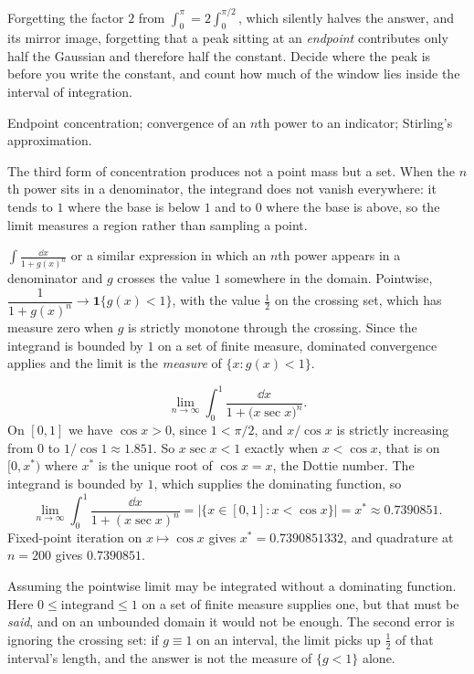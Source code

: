 \begin{trap}
Forgetting the factor $2$ from $\int_{0}^{\pi}=2\int_{0}^{\pi/2}$, which silently halves the answer, and its mirror image, forgetting that a peak sitting at an \emph{endpoint} contributes only half the Gaussian and therefore half the constant. Decide where the peak is before you write the constant, and count how much of the window lies inside the interval of integration.
\end{trap}

\begin{seealsob}Endpoint concentration; convergence of an $n$th power to an indicator; Stirling's approximation.\end{seealsob}

The third form of concentration produces not a point mass but a set. When the $n$th power sits in a denominator, the integrand does not vanish everywhere: it tends to $1$ where the base is below $1$ and to $0$ where the base is above, so the limit measures a region rather than sampling a point.

\cue $\displaystyle\int\frac{\dd x}{1+g(x)^{n}}$ or a similar expression in which an $n$th power appears in a denominator and $g$ crosses the value $1$ somewhere in the domain.
\method Pointwise, $\dfrac{1}{1+g(x)^{n}}\to\mathbf{1}\{g(x)<1\}$, with the value $\tfrac12$ on the crossing set, which has measure zero when $g$ is strictly monotone through the crossing. Since the integrand is bounded by $1$ on a set of finite measure, dominated convergence applies and the limit is the \emph{measure} of $\{x:g(x)<1\}$.

\begin{worked}
\[\lim_{n\to\infty}\int_{0}^{1}\frac{\dd x}{1+\bigl(x\sec x\bigr)^{n}} .\]
On $[0,1]$ we have $\cos x>0$, since $1<\pi/2$, and $x/\cos x$ is strictly increasing from $0$ to $1/\cos1\approx1.851$. So $x\sec x<1$ exactly when $x<\cos x$, that is on $[0,x^{*})$ where $x^{*}$ is the unique root of $\cos x=x$, the Dottie number. The integrand is bounded by $1$, which supplies the dominating function, so
\[\lim_{n\to\infty}\int_{0}^{1}\frac{\dd x}{1+(x\sec x)^{n}}=\bigl\lvert\{x\in[0,1]:x<\cos x\}\bigr\rvert=x^{*}\approx0.7390851 .\]
Fixed-point iteration on $x\mapsto\cos x$ gives $x^{*}=0.7390851332$, and quadrature at $n=200$ gives $0.7390851$.
\end{worked}

\begin{trap}
Assuming the pointwise limit may be integrated without a dominating function. Here $0\leq\text{integrand}\leq1$ on a set of finite measure supplies one, but that must be \emph{said}, and on an unbounded domain it would not be enough. The second error is ignoring the crossing set: if $g\equiv1$ on an interval, the limit picks up $\tfrac12$ of that interval's length, and the answer is not the measure of $\{g<1\}$ alone.
\end{trap}

